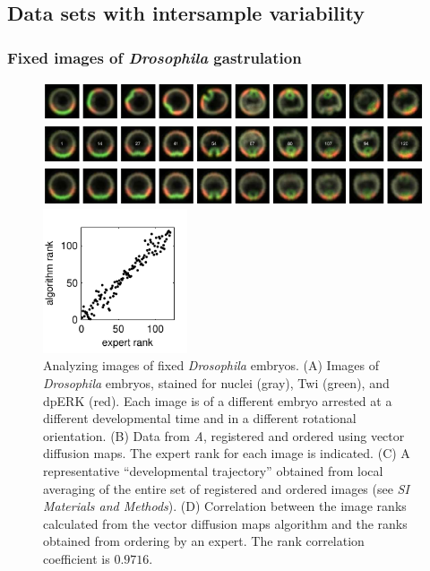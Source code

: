 \documentclass[twocolumn, 10pt]{article}
\newcommand{\SI}[0]{\textit{SI Materials and Methods}}
\begin{document}
\subsection*{Data sets with intersample variability}

\subsubsection*{Fixed images of {\em Drosophila} gastrulation}

\begin{figure}[t]
\begin{minipage}[b]{12cm}
\includegraphics[width=12.25cm]{drosophila_fixed_images_scrambled}

\includegraphics[width=12.25cm]{drosophila_fixed_images_ordered}

\includegraphics[width=12.25cm]{drosophila_fixed_images_average}
\end{minipage}
%
\hfill
%
\includegraphics[width=4.25cm]{drosophila_fixed_images_rank_corr}
%
\caption{Analyzing images of fixed \textit{Drosophila} embryos. {(A)} Images of \textit{ Drosophila} embryos, stained for nuclei (gray), Twi (green), and dpERK (red). Each image is of a different embryo arrested at a different developmental time and in a different rotational orientation. {(B)} Data from {\it A}, registered and ordered using vector diffusion maps. The expert rank for each image is indicated. {(C)} A representative ``developmental trajectory'' obtained from local averaging of the entire set of registered and ordered images (see \SI). {(D)} Correlation between the image ranks calculated from the vector diffusion maps algorithm and the ranks obtained from ordering by an expert. The rank correlation coefficient is $0.9716$. }
\label{fig:drosophila_fixed_images}
\end{figure}
\end{document}

